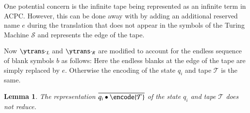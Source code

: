 \documentclass[submission,copyright,creativecommons]{eptcs}
\newtheorem{lemma}[theorem]{Lemma}
\newcommand{\oan}[1]{\overline{#1}}
\begin{document}
One potential concern is the infinite tape being represented as an infinite term
in ACPC. However, this can be done away with by adding an additional reserved name $e$
during the translation that does not appear in the symbols of the Turing Machine ${\mathcal S}$
and represents the edge of the tape.


Now $\ytrans \cdot _L$ and $\ytrans \cdot _R$ are modified to account for the
endless sequence of blank symbols $b$ as follows:
Here the endless blanks at the edge of the tape are simply replaced by $e$.
Otherwise the encoding of the state $q_i$ and tape ${\mathcal T}$ is the same.

\begin{lemma}
\label{lem:fin:tape-no-red}
The representation $\oan {q_i\bullet \encode {\mathcal T}}$ of the state $q_i$
and tape ${\mathcal T}$ does not reduce.
\end{lemma}
\end{document}
